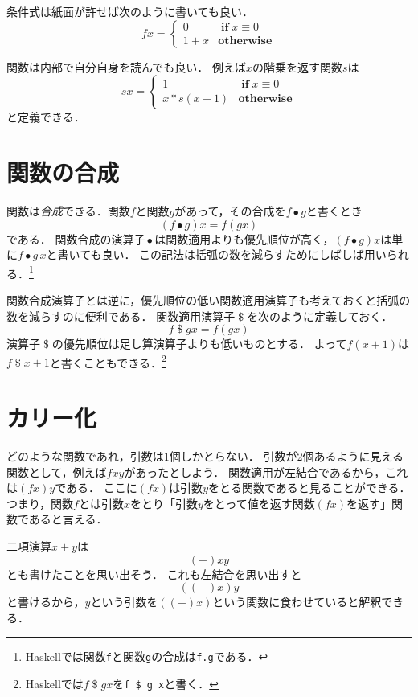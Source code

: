 \documentclass[twocolumn]{jsbook}
\newcommand{\mathKeyword}[1]{\mathbf{#1}}
\DeclareMathOperator{\mathApply}{\$}
\DeclareMathOperator{\mathCompose}{\bullet}
\DeclareMathOperator{\mathIf}{\mathKeyword{if}}
\newcommand{\mathOtherwise}{\mathKeyword{otherwise}}
\newcommand{\keyword}[1]{\emph{#1}}
\newcommand{\code}[1]{\texttt{#1}}
\begin{document}
条件式は紙面が許せば次のように書いても良い．
\begin{equation*}
fx=\begin{cases}
0&\mathIf x\equiv0\\
1+x&\mathOtherwise
\end{cases}
\end{equation*}


関数は内部で自分自身を読んでも良い．
例えば$x$の階乗を返す関数$s$は
\begin{equation*}
sx=\begin{cases}
1&\mathIf x\equiv0\\
x*s(x-1)&\mathOtherwise
\end{cases}
\end{equation*}
と定義できる．

\section{関数の合成}

関数は\keyword{合成}できる．関数$f$と関数$g$があって，その合成を$f\mathCompose g$と書くとき$$(f\mathCompose g)x=f(gx)$$である．
関数合成の演算子$\mathCompose$は関数適用よりも優先順位が高く，$(f\mathCompose g)x$は単に$f\mathCompose g\,x$と書いても良い．
この記法は括弧の数を減らすためにしばしば用いられる．\footnote{Haskellでは関数\code{f}と関数\code{g}の合成は\code{f.g}である．}

関数合成演算子とは逆に，優先順位の低い関数適用演算子も考えておくと括弧の数を減らすのに便利である．
関数適用演算子$\mathApply$を次のように定義しておく．
$$f\mathApply gx=f(gx)$$
演算子$\mathApply$の優先順位は足し算演算子よりも低いものとする．
よって$f(x+1)$は$f\mathApply x+1$と書くこともできる．\footnote{Haskellでは$f\mathApply gx$を\code{f \$ g x}と書く．}

\section{カリー化}

どのような関数であれ，引数は1個しかとらない．
引数が2個あるように見える関数として，例えば$fxy$があったとしよう．
関数適用が左結合であるから，これは$(fx)y$である．
ここに$(fx)$は引数$y$をとる関数であると見ることができる．
つまり，関数$f$とは引数$x$をとり「引数$y$をとって値を返す関数$(fx)$を返す」関数であると言える．

二項演算$x+y$は$$(+)xy$$とも書けたことを思い出そう．
これも左結合を思い出すと$$((+)x)y$$と書けるから，$y$という引数を$((+)x)$という関数に食わせていると解釈できる．
\end{document}

